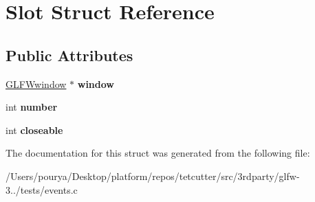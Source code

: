 \hypertarget{structSlot}{}\section{Slot Struct Reference}
\label{structSlot}
\subsection*{Public Attributes}
\begin{DoxyCompactItemize}
\item 
\hypertarget{structSlot_a4b5e7eed4763361b8bf2a78a3b28913c}{}\hyperlink{group__window_ga3c96d80d363e67d13a41b5d1821f3242}{G\+L\+F\+Wwindow} $\ast$ {\bfseries window}\label{structSlot_a4b5e7eed4763361b8bf2a78a3b28913c}

\item 
\hypertarget{structSlot_a75f94e08120f69047ec87b920011b62b}{}int {\bfseries number}\label{structSlot_a75f94e08120f69047ec87b920011b62b}

\item 
\hypertarget{structSlot_aa0d37b6ab4bb3b80baf443d4b3183633}{}int {\bfseries closeable}\label{structSlot_aa0d37b6ab4bb3b80baf443d4b3183633}

\end{DoxyCompactItemize}


The documentation for this struct was generated from the following file\+:\begin{DoxyCompactItemize}
\item 
/\+Users/pourya/\+Desktop/platform/repos/tetcutter/src/3rdparty/glfw-\/3../tests/events.\+c\end{DoxyCompactItemize}
